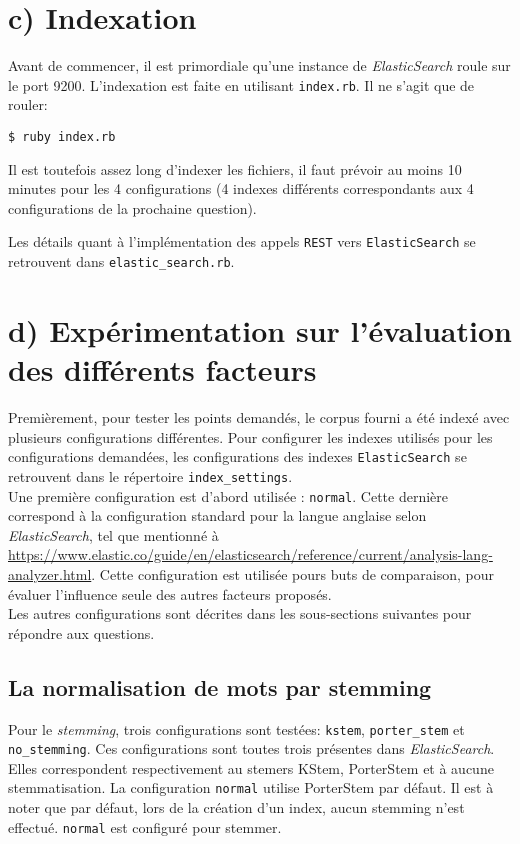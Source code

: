 \documentclass[12pt]{article}
\begin{document}
\section{c) Indexation}
Avant de commencer, il est primordiale qu'une instance de \textit{ElasticSearch} roule sur le port 9200. L'indexation est faite en utilisant \verb;index.rb;. Il ne s'agit que de rouler:

\begin{verbatim}
$ ruby index.rb
\end{verbatim}

Il est toutefois assez long d'indexer les fichiers, il faut prévoir au moins 10 minutes pour les 4 configurations (4 indexes différents correspondants aux 4 configurations de la prochaine question).

Les détails quant à l'implémentation des appels \verb;REST; vers \verb;ElasticSearch; se retrouvent dans \verb;elastic_search.rb;.

\section{d) Expérimentation sur l'évaluation des différents facteurs}
Premièrement, pour tester les points demandés, le corpus fourni a été indexé avec plusieurs configurations différentes. Pour configurer les indexes utilisés pour les configurations demandées, les configurations des indexes \verb;ElasticSearch; se retrouvent dans le répertoire \verb;index_settings;.\\

Une première configuration est d'abord utilisée : \verb;normal;. Cette dernière correspond à la configuration standard pour la langue anglaise selon \textit{ElasticSearch}, tel que mentionné à \url{https://www.elastic.co/guide/en/elasticsearch/reference/current/analysis-lang-analyzer.html}. Cette configuration est utilisée pours buts de comparaison, pour évaluer l'influence seule des autres facteurs proposés.\\

Les autres configurations sont décrites dans les sous-sections suivantes pour répondre aux questions.

\subsection{La normalisation de mots par stemming}
Pour le \textit{stemming}, trois configurations sont testées: \verb;kstem;, \verb;porter_stem; et \verb;no_stemming;. Ces configurations sont toutes trois présentes dans \textit{ElasticSearch}. Elles correspondent respectivement au stemers KStem, PorterStem et à aucune stemmatisation. La configuration \verb;normal; utilise PorterStem par défaut. Il est à noter que par défaut, lors de la création d'un index, aucun stemming n'est effectué. \verb;normal; est configuré pour stemmer.\\
\end{document}
